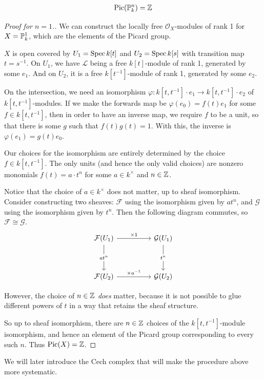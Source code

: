 \begin{proposition}
	\begin{align*}
		\operatorname{Pic}(\P^n_k) = \Z
	\end{align*}
\end{proposition}

\begin{proof}[Proof for $n=1$.]
	We can construct the locally free $\mathcal{O}_X$-modules of rank 1 for $X = \P^1_k$, which are the elements of the Picard group. 
	
	$X$ is open covered by $U_1 = \Spec k[t]$ and $U_2 = \Spec k[s]$ with transition map $t = s^{-1}$. On $U_1$, we have $\mathcal{L}$ being a free $k[t]$-module of rank 1, generated by some $e_1$. And on $U_2$, it is a free $k[t^{-1}]$-module of rank 1, generated by some $e_2$. 
	
	On the intersection, we need an isomorphism $\varphi: k[t,t^{-1}] \cdot e_1 \to k[t, t^{-1}] \cdot e_2$ of $k[t, t^{-1}]$-modules. If we make the forwards map be $\varphi(e_0) = f(t) e_1$ for some $f \in k[t, t^{-1}]$, then in order to have an inverse map, we require $f$ to be a unit, so that there is some $g$ such that $f(t) g(t) = 1$. With this, the inverse is $\varphi(e_1) = g(t) e_0$.
	
	Our choices for the isomorphism are entirely determined by the choice $f \in k[t, t^{-1}]$. The only units (and hence the only valid choices) are nonzero monomials $f(t) = a \cdot t^n$ for some $a \in k^\times$ and $n \in \Z$.
	
	Notice that the choice of $a \in k^\times$ does not matter, up to sheaf isomorphism. Consider constructing two sheaves: $\mathcal{F}$ using the isomorphism given by $at^n$, and $\mathcal{G}$ using the isomorphism given by $t^n$. Then the following diagram commutes, so $\mathcal{F} \cong \mathcal{G}$.
	\[\begin{tikzcd}
		{\mathcal{F}(U_1)} && {\mathcal{G}(U_1)} \\
		\\
		{\mathcal{F}(U_2)} && {\mathcal{G}(U_2)}
		\arrow["{\times 1}", from=1-1, to=1-3]
		\arrow["{a t^n}"{description}, from=1-1, to=3-1]
		\arrow["{t^n}"{description}, from=1-3, to=3-3]
		\arrow["{\times a^{-1}}", from=3-1, to=3-3]
	\end{tikzcd}\]
	
	However, the choice of $n \in \Z$ \textit{does} matter, because it is not possible to glue different powers of $t$ in a way that retains the sheaf structure. 
	
	So up to sheaf isomorphism, there are $n \in \Z$ choices of the $k[t,t^{-1}]$-module isomorphism, and hence an element of the Picard group corresponding to every such $n$. Thus $\operatorname{Pic}(X) = \Z$. 
      \end{proof}

      \begin{remark}
        We will later introduce the Cech complex that will make the procedure above more systematic.
      \end{remark}



